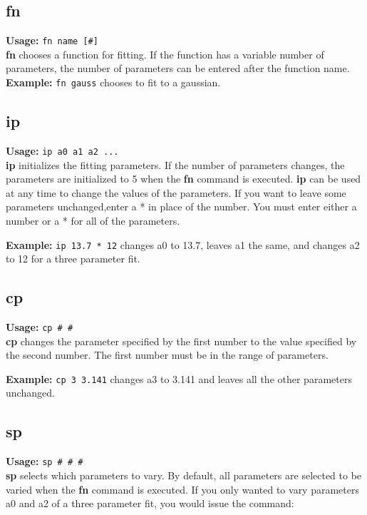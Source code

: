 \subsection{fn}

{\bf Usage: } {\tt  fn name [\#]} \\

{\bf fn} chooses a function for fitting.  If the function has a
variable number of parameters, the number of parameters
can be entered after the function name.
{\bf Example: } {\tt fn gauss} chooses to fit to a gaussian.

\subsection{ip}     {\bf Usage: } {\tt  ip a0 a1 a2 ...} \\

        {\bf ip} initializes the fitting parameters.  If the number 
 of parameters changes, the
 parameters are initialized to 5 when the {\bf fn} command is 
 executed.  {\bf ip} can be used at any time to change the values 
 of the parameters. If you want to leave some parameters 
 unchanged,enter a * in place of the number.  You must enter 
 either a number or a * for all of the parameters.

        {\bf Example: } {\tt ip 13.7 * 12} changes a0 to 13.7, leaves
 a1 the same, and changes a2 to 12 for a three parameter fit.

\subsection{cp}		{\bf Usage: } {\tt  cp \# \#} \\

		{\bf cp } changes the parameter specified by the first
 number to the value specified by the second number.  The 
 first number must be in the range of parameters.

		{\bf Example:} {\tt cp 3 3.141} changes a3 to 3.141 and leaves
 all the other parameters unchanged.

\subsection{sp}     {\bf Usage: } {\tt  sp \# \# \#} \\

        {\bf sp } selects which parameters to vary.  By default,
 all parameters are selected to be varied when the {\bf fn } 
 command is executed.  If you only wanted to vary 
 parameters a0 and a2 of a three parameter fit, you would 
 issue the command:

